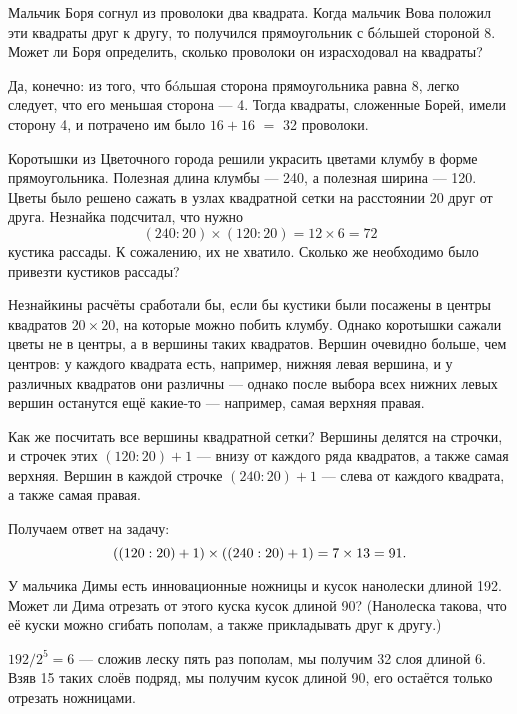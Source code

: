 

\begin{itemize}

	\itA Мальчик Боря согнул из проволоки два квадрата. Когда мальчик Вова положил эти квадраты друг к другу, то получился прямоугольник с б\'oльшей стороной \SI{8}{}. Может ли Боря определить, сколько проволоки он израсходовал на квадраты?
	
	\itr Да, конечно: из того, что б\'oльшая сторона прямоугольника равна \SI{8}{}, легко следует, что его меньшая сторона — \SI{4}{}. Тогда квадраты, сложенные Борей, имели сторону \SI{4}{}, и потрачено им было $16+16$ $=$ \SI{32}{} проволоки.
	
	\def\cm#1{\SI{#1}{\text{см}}}
	\itB Коротышки из Цветочного города решили украсить цветами клумбу в форме прямоугольника. Полезная длина клумбы — \cm{240}, а полезная ширина — \cm{120}. Цветы было решено сажать в узлах квадратной сетки на расстоянии \cm{20} друг от друга. Незнайка подсчитал, что нужно
	$$(240 : 20) \times (120 : 20) = 12 \times 6 = 72$$
	кустика рассады. К сожалению, их не хватило. Сколько же необходимо было привезти кустиков рассады?
	
	\itr Незнайкины расчёты сработали бы, если бы кустики были посажены в центры квадратов $20 \times 20$, на которые можно побить клумбу. Однако коротышки сажали цветы не в центры, а в вершины таких квадратов. Вершин очевидно больше, чем центров: у каждого квадрата есть, например, нижняя левая вершина, и у различных квадратов они различны — однако после выбора всех нижних левых вершин останутся ещё какие-то — например, самая верхняя правая.
	
	Как же посчитать все вершины квадратной сетки? Вершины делятся на строчки, и строчек этих $(120 : 20) +1$ — внизу от каждого ряда квадратов, а также самая верхняя. Вершин в каждой строчке $(240 : 20) +1$ — слева от каждого квадрата, а также самая правая.
	
	Получаем ответ на задачу:
	$$\left(\left(120 : 20\right) +1\right) \times \left(\left(240 : 20\right) +1\right) = 7 \times 13 = 91.$$
	
	\itC У мальчика Димы есть инновационные ножницы и кусок нанолески длиной \cm{192}. Может ли Дима отрезать от этого куска кусок длиной \cm{90}? (Нанолеска такова, что её куски можно сгибать пополам, а также прикладывать друг к другу.)
	
	\itr $192 / 2^5 = 6$ — сложив леску пять раз пополам, мы получим 32 слоя длиной \cm{6}. Взяв 15 таких слоёв подряд, мы получим кусок длиной \cm{90}, его остаётся только отрезать ножницами.

\end{itemize}

